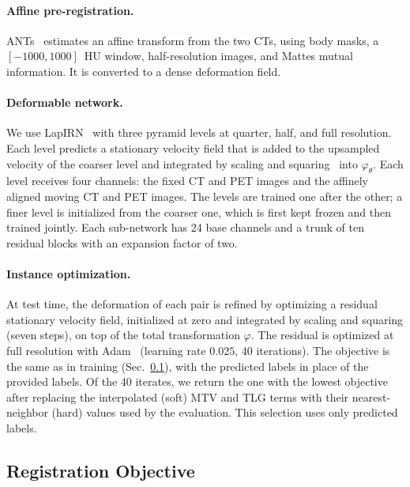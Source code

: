 \paragraph{Affine pre-registration.}
ANTs~\cite{ants} estimates an affine transform from the two CTs, using body masks, a $[-1000,1000]$~HU window, half-resolution images, and Mattes mutual information.
It is converted to a dense deformation field.

\paragraph{Deformable network.}
We use LapIRN~\cite{ref_lapirn} with three pyramid levels at quarter, half, and full resolution.
Each level predicts a stationary velocity field that is added to the upsampled velocity of the coarser level and integrated by scaling and squaring~\cite{ref_arsigny} into $\varphi_\theta$.
Each level receives four channels: the fixed CT and PET images and the affinely aligned moving CT and PET images.
The levels are trained one after the other; a finer level is initialized from the coarser one, which is first kept frozen and then trained jointly.
Each sub-network has 24 base channels and a trunk of ten residual blocks with an expansion factor of two.

\paragraph{Instance optimization.}
\label{sect:io}
At test time, the deformation of each pair is refined by optimizing a residual stationary velocity field, initialized at zero and integrated by scaling and squaring (seven steps), on top of the total transformation $\varphi$.
The residual is optimized at full resolution with Adam~\cite{ref_adam} (learning rate $0.025$, 40 iterations).
The objective is the same as in training (Sec.~\ref{sect:objective}), with the predicted labels in place of the provided labels.
Of the 40 iterates, we return the one with the lowest objective after replacing the interpolated (soft) MTV and TLG terms with their nearest-neighbor (hard) values used by the evaluation.
This selection uses only predicted labels.

\subsection{Registration Objective}
\label{sect:objective}

